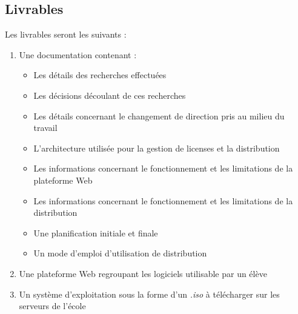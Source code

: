 \subsection*{Livrables}
Les livrables seront les suivants :
\begin{enumerate}
\item Une documentation contenant :
	\begin{itemize}
	\item Les détails des recherches effectuées
	\item Les décisions découlant de ces recherches
	\item Les détails concernant le changement de direction pris au milieu du travail
	\item L'architecture utilisée pour la gestion de licenses et la distribution 
	\item Les informations concernant le fonctionnement et les limitations de la plateforme Web 
	\item Les informations concernant le fonctionnement et les limitations de la distribution 
	\item Une planification initiale et finale
	\item Un mode d’emploi d'utilisation de distribution
	\end{itemize}
\item Une plateforme Web regroupant les logiciels utilisable par un élève
\item Un système d'exploitation sous la forme d'un \textit{.iso} à télécharger sur les serveurs de l'école
\end{enumerate}

